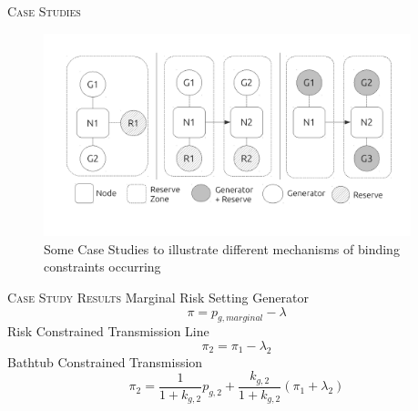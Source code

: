 \documentclass[xcolor=x11names,compress]{beamer}
\renewcommand{\(}{\begin{columns}}
\renewcommand{\)}{\end{columns}}
\newcommand{\<}[1]{\begin{column}{#1}}
\renewcommand{\>}{\end{column}}
\begin{document}
\begin{frame}{\scshape Case Studies}
\begin{figure}
\includegraphics[width=0.95\textwidth]{img/nodal_diagram.pdf}
\caption{Some Case Studies to illustrate different mechanisms of binding
constraints occurring}
\end{figure}
\end{frame}


\begin{frame}{\scshape Case Study Results}
Marginal Risk Setting Generator
\begin{equation}
\pi = p_{g,marginal} - \lambda
\end{equation}
Risk Constrained Transmission Line
\begin{equation}
\pi_2 = \pi_1 - \lambda_2
\end{equation}
Bathtub Constrained Transmission
\begin{equation}
\pi_2 = \dfrac{1}{1+k_{g,2}}p_{g,2} + \dfrac{k_{g,2}}{1+k_{g,2}}(\pi_1 + \lambda_{2})
\end{equation}
\end{frame}
\end{document}
